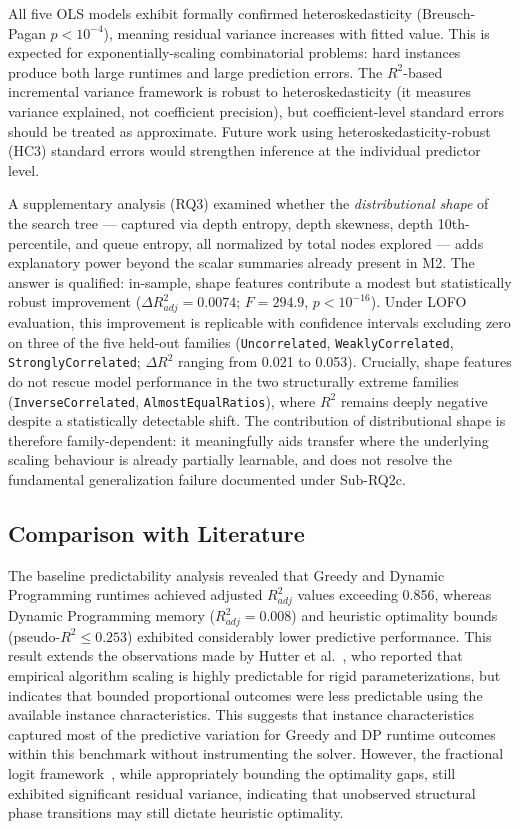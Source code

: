 \documentclass[sigconf]{acmart}
\begin{document}
All five OLS models exhibit formally confirmed heteroskedasticity (Breusch-Pagan $p < 10^{-4}$), meaning residual variance increases with fitted value. This is expected for exponentially-scaling combinatorial problems: hard instances produce both large runtimes and large prediction errors. The $R^2$-based incremental variance framework is robust to heteroskedasticity (it measures variance explained, not coefficient precision), but coefficient-level standard errors should be treated as approximate. Future work using heteroskedasticity-robust (HC3) standard errors would strengthen inference at the individual predictor level.

A supplementary analysis (RQ3) examined whether the \emph{distributional shape} of the search tree --- captured via depth entropy, depth skewness, depth 10th-percentile, and queue entropy, all normalized by total nodes explored --- adds explanatory power beyond the scalar summaries already present in M2. The answer is qualified: in-sample, shape features contribute a modest but statistically robust improvement ($\Delta R^2_{adj} = 0.0074$; $F = 294.9$, $p < 10^{-16}$). Under LOFO evaluation, this improvement is replicable with confidence intervals excluding zero on three of the five held-out families (\texttt{Uncorrelated}, \texttt{WeaklyCorrelated}, \texttt{StronglyCorrelated}; $\Delta R^2$ ranging from 0.021 to 0.053). Crucially, shape features do not rescue model performance in the two structurally extreme families (\texttt{InverseCorrelated}, \texttt{AlmostEqualRatios}), where $R^2$ remains deeply negative despite a statistically detectable shift. The contribution of distributional shape is therefore family-dependent: it meaningfully aids transfer where the underlying scaling behaviour is already partially learnable, and does not resolve the fundamental generalization failure documented under Sub-RQ2c.

\subsection{Comparison with Literature}
The baseline predictability analysis revealed that Greedy and Dynamic Programming runtimes achieved adjusted $R^2_{adj}$ values exceeding 0.856, whereas Dynamic Programming memory ($R^2_{adj} = 0.008$) and heuristic optimality bounds (pseudo-$R^2 \le 0.253$) exhibited considerably lower predictive performance. This result extends the observations made by Hutter et al.~\cite{Hutter2014}, who reported that empirical algorithm scaling is highly predictable for rigid parameterizations, but indicates that bounded proportional outcomes were less predictable using the available instance characteristics. This suggests that instance characteristics captured most of the predictive variation for Greedy and DP runtime outcomes within this benchmark without instrumenting the solver. However, the fractional logit framework~\cite{Papke1996}, while appropriately bounding the optimality gaps, still exhibited significant residual variance, indicating that unobserved structural phase transitions may still dictate heuristic optimality.
\end{document}
